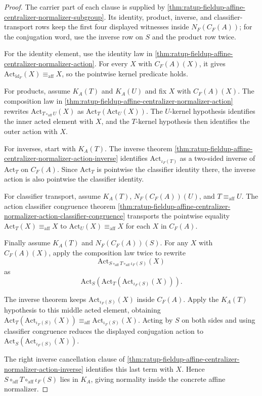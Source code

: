 \begin{proof}
The carrier part of each clause is supplied by
\autoref{thm:ratup-fieldup-affine-centralizer-normalizer-subgroup}. Its
identity, product, inverse, and classifier-transport rows keep the first four
displayed witnesses inside $N_F(C_F(A))$; for the conjugation word, use the
inverse row on $S$ and the product row twice.

For the identity element, use the identity law in
\autoref{thm:ratup-fieldup-affine-centralizer-normalizer-action}. For every
$X$ with $C_F(A)(X)$, it gives
$\mathrm{Act}_{\mathrm{id}_F}(X)\equiv_{\mathrm{aff}}X$, so the pointwise
kernel predicate holds.

For products, assume $K_A(T)$ and $K_A(U)$ and fix $X$ with $C_F(A)(X)$. The
composition law in
\autoref{thm:ratup-fieldup-affine-centralizer-normalizer-action} rewrites
$\mathrm{Act}_{T\circ_{\mathrm{aff}}U}(X)$ as
$\mathrm{Act}_T(\mathrm{Act}_U(X))$. The $U$-kernel hypothesis identifies the
inner acted element with $X$, and the $T$-kernel hypothesis then identifies the
outer action with $X$.

For inverses, start with $K_A(T)$. The inverse theorem
\autoref{thm:ratup-fieldup-affine-centralizer-normalizer-action-inverse}
identifies $\mathrm{Act}_{\iota_F(T)}$ as a two-sided inverse of
$\mathrm{Act}_T$ on $C_F(A)$. Since $\mathrm{Act}_T$ is pointwise the classifier
identity there, the inverse action is also pointwise the classifier identity.

For classifier transport, assume $K_A(T)$, $N_F(C_F(A))(U)$, and
$T\equiv_{\mathrm{aff}}U$. The action classifier congruence theorem
\autoref{thm:ratup-fieldup-affine-centralizer-normalizer-action-classifier-congruence}
transports the pointwise equality
$\mathrm{Act}_T(X)\equiv_{\mathrm{aff}}X$ to
$\mathrm{Act}_U(X)\equiv_{\mathrm{aff}}X$ for each $X$ in $C_F(A)$.

Finally assume $K_A(T)$ and $N_F(C_F(A))(S)$. For any $X$ with $C_F(A)(X)$,
apply the composition law twice to rewrite
$$
\mathrm{Act}_{S\circ_{\mathrm{aff}}T\circ_{\mathrm{aff}}\iota_F(S)}(X)
$$
as
$$
\mathrm{Act}_S(\mathrm{Act}_T(\mathrm{Act}_{\iota_F(S)}(X))).
$$

The inverse theorem keeps $\mathrm{Act}_{\iota_F(S)}(X)$ inside $C_F(A)$. Apply
the $K_A(T)$ hypothesis to this middle acted element, obtaining
$\mathrm{Act}_T(\mathrm{Act}_{\iota_F(S)}(X))
\equiv_{\mathrm{aff}}\mathrm{Act}_{\iota_F(S)}(X)$. Acting by $S$ on both sides
and using classifier congruence reduces the displayed conjugation action to
$\mathrm{Act}_S(\mathrm{Act}_{\iota_F(S)}(X))$.

The right inverse cancellation clause of
\autoref{thm:ratup-fieldup-affine-centralizer-normalizer-action-inverse}
identifies this last term with $X$. Hence
$S\circ_{\mathrm{aff}}T\circ_{\mathrm{aff}}\iota_F(S)$ lies in $K_A$, giving
normality inside the concrete affine normalizer.
\end{proof}

